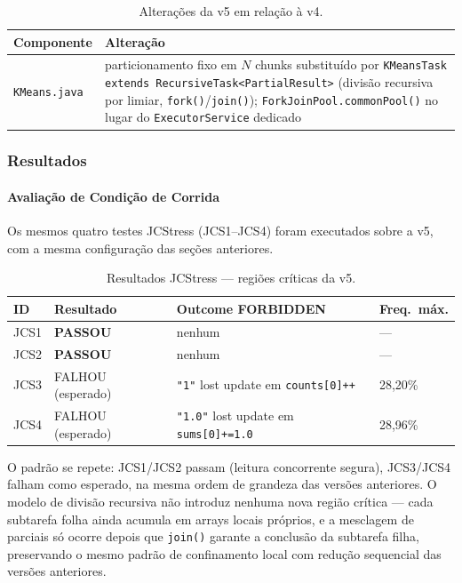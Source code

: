 \begin{table}[H]
\centering
\begin{tabular}{lp{11cm}}
\hline
\textbf{Componente} & \textbf{Alteração} \\
\hline
\texttt{KMeans.java} & particionamento fixo em $N$ chunks substituído por
                       \texttt{KMeansTask extends RecursiveTask<PartialResult>}
                       (divisão recursiva por limiar, \texttt{fork()}/\texttt{join()});
                       \texttt{ForkJoinPool.commonPool()} no lugar do
                       \texttt{ExecutorService} dedicado \\
\hline
\end{tabular}
\caption{Alterações da v5 em relação à v4.}
\label{tab:v5-changes}
\end{table}

\subsubsection{Resultados}

\paragraph{Avaliação de Condição de Corrida}

Os mesmos quatro testes JCStress (JCS1--JCS4) foram executados sobre a
v5, com a mesma configuração das seções anteriores.

\begin{table}[H]
\centering
\begin{tabular}{llll}
\hline
\textbf{ID} & \textbf{Resultado} & \textbf{Outcome FORBIDDEN} & \textbf{Freq.\ máx.} \\
\hline
JCS1 & \textbf{PASSOU}            & nenhum                   & ---      \\
JCS2 & \textbf{PASSOU}            & nenhum                   & ---      \\
JCS3 & FALHOU (esperado) & \texttt{"1"} lost update em \texttt{counts[0]++}  & 28,20\% \\
JCS4 & FALHOU (esperado) & \texttt{"1.0"} lost update em \texttt{sums[0]+=1.0} & 28,96\% \\
\hline
\end{tabular}
\caption{Resultados JCStress --- regiões críticas da v5.}
\label{tab:jcstress-v5}
\end{table}

O padrão se repete: JCS1/JCS2 passam (leitura concorrente segura),
JCS3/JCS4 falham como esperado, na mesma ordem de grandeza das versões
anteriores. O modelo de divisão recursiva não introduz nenhuma nova
região crítica --- cada subtarefa folha ainda acumula em arrays locais
próprios, e a mesclagem de parciais só ocorre depois que
\texttt{join()} garante a conclusão da subtarefa filha, preservando o
mesmo padrão de confinamento local com redução sequencial das versões
anteriores.

